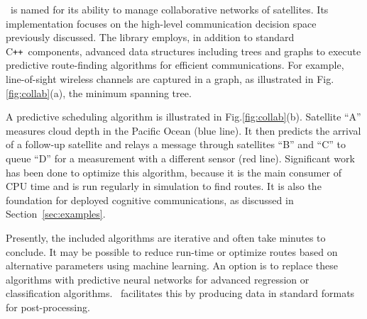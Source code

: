 \documentclass[conference]{IEEEtran}
\newcommand{\project}{{\sc{Collaborate}}~}
\newcommand{\cpp}{C\texttt{++}~}
\begin{document}
\project is named for its ability to manage collaborative networks of satellites.  Its implementation focuses on the high-level communication decision space previously discussed.  The library employs, in addition to standard \cpp components, advanced data structures including trees and graphs to execute predictive route-finding algorithms for efficient communications.  For example, line-of-sight wireless channels are captured in a graph, as illustrated in Fig.\ref{fig:collab}(a), the minimum spanning tree.

A predictive scheduling algorithm is illustrated in Fig.\ref{fig:collab}(b).  Satellite ``A'' measures cloud depth in the Pacific Ocean (blue line).  It then predicts the arrival of a follow-up satellite and relays a message through satellites ``B'' and ``C'' to queue ``D'' for a measurement with a different sensor (red line).  Significant work has been done to optimize this algorithm, because it is the main consumer of CPU time and is run regularly in simulation to find routes.  It is also the foundation for deployed cognitive communications, as discussed in Section~\ref{sec:examples}.

Presently, the included algorithms are iterative and often take minutes to conclude.  It may be possible to reduce run-time or optimize routes based on alternative parameters using machine learning.  An option is to replace these algorithms with predictive neural networks for advanced regression or classification algorithms.  \project facilitates this by producing data in standard formats for post-processing.
\end{document}
